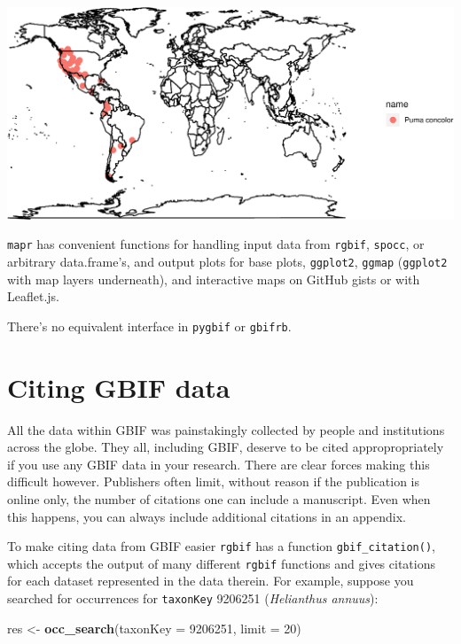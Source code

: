 \documentclass[3p]{elsarticle} %
\makeatletter
\newenvironment{Shaded}{\begin{snugshade}}{\end{snugshade}}
\newcommand{\DataTypeTok}[1]{\textcolor[rgb]{0.13,0.29,0.53}{#1}}
\newcommand{\DecValTok}[1]{\textcolor[rgb]{0.00,0.00,0.81}{#1}}
\newcommand{\KeywordTok}[1]{\textcolor[rgb]{0.13,0.29,0.53}{\textbf{#1}}}
\newcommand{\NormalTok}[1]{#1}
\newcommand{\StringTok}[1]{\textcolor[rgb]{0.31,0.60,0.02}{#1}}
\def\maxwidth{\ifdim\Gin@nat@width>\linewidth\linewidth
\else\Gin@nat@width\fi}
\let\Oldincludegraphics\includegraphics
\renewcommand{\includegraphics}[1]{\Oldincludegraphics[width=\maxwidth]{#1}}
\makeatother
\begin{document}
\includegraphics{components/figure/manuscript_mee-unnamed-chunk-47-1.pdf}

\texttt{mapr} has convenient functions for handling input data from
\texttt{rgbif}, \texttt{spocc}, or arbitrary data.frame's, and output
plots for base plots, \texttt{ggplot2}, \texttt{ggmap} (\texttt{ggplot2}
with map layers underneath), and interactive maps on GitHub gists or
with Leaflet.js.

There's no equivalent interface in \texttt{pygbif} or \texttt{gbifrb}.

\hypertarget{citing-gbif-data}{%
\section{Citing GBIF data}\label{citing-gbif-data}}

All the data within GBIF was painstakingly collected by people and
institutions across the globe. They all, including GBIF, deserve to be
cited appropropriately if you use any GBIF data in your research. There
are clear forces making this difficult however. Publishers often limit,
without reason if the publication is online only, the number of
citations one can include a manuscript. Even when this happens, you can
always include additional citations in an appendix.

To make citing data from GBIF easier \texttt{rgbif} has a function
\texttt{gbif\_citation()}, which accepts the output of many different
\texttt{rgbif} functions and gives citations for each dataset
represented in the data therein. For example, suppose you searched for
occurrences for \texttt{taxonKey} 9206251 (\emph{Helianthus annuus}):

\begin{Shaded}
\begin{Highlighting}[]
\NormalTok{res <{-}}\StringTok{ }\KeywordTok{occ\_search}\NormalTok{(}\DataTypeTok{taxonKey =} \DecValTok{9206251}\NormalTok{, }\DataTypeTok{limit =} \DecValTok{20}\NormalTok{)}
\end{Highlighting}
\end{Shaded}
\end{document}
